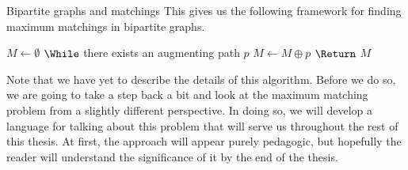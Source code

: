 \documentclass[11pt]{article}
\renewcommand{\'}{^{'}}
\begin{document}
\begin{section}{Bipartite graphs and matchings}
	This gives us the following framework for finding maximum matchings in bipartite graphs.

	\begin{codebox}
		\li $M \gets \emptyset $
		\li $\While$ there exists an augmenting path $p$
			\Do
		\li		$M \gets M\oplus p$
			\End
		\li $\Return$ $M$
	\end{codebox}

	Note that we have yet to describe the details of this algorithm. Before we do so, we are going 
	to take a step back a bit and look at the maximum matching problem from a slightly different 
	perspective. In doing so, we will develop a language for talking about this problem that will 
	serve us throughout the rest of this thesis. At first, the approach will appear purely 
	pedagogic, but hopefully the reader will understand the significance of it by the end of the 
	thesis.

\end{section}
\end{document}
